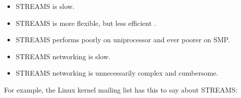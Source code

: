 \documentclass[letterpaper,final,notitlepage,twocolumn,10pt,twoside]{article}
\begin{document}
\begin{itemize}

\item STREAMS is slow.

\item STREAMS is more flexible, but less efficient \cite{lkmlfaq}.

\item STREAMS performs poorly on uniprocessor and ever poorer on SMP.

\item STREAMS networking is slow.

\item STREAMS networking is unnecessarily complex and cumbersome.

\end{itemize}

For example, the Linux kernel mailing list has this to say about STREAMS:
\end{document}
